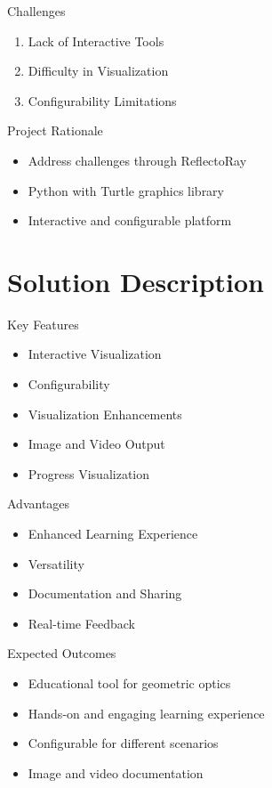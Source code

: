 \documentclass{beamer}
\begin{document}
\begin{frame}{Challenges}
  \begin{enumerate}
    \item Lack of Interactive Tools
    \item Difficulty in Visualization
    \item Configurability Limitations
  \end{enumerate}
\end{frame}

\begin{frame}{Project Rationale}
  \begin{itemize}
    \item Address challenges through ReflectoRay
    \item Python with Turtle graphics library
    \item Interactive and configurable platform
  \end{itemize}
\end{frame}

\section{Solution Description}
\begin{frame}{Key Features}
  \begin{itemize}
    \item Interactive Visualization
    \item Configurability
    \item Visualization Enhancements
    \item Image and Video Output
    \item Progress Visualization
  \end{itemize}
\end{frame}

\begin{frame}{Advantages}
  \begin{itemize}
    \item Enhanced Learning Experience
    \item Versatility
    \item Documentation and Sharing
    \item Real-time Feedback
  \end{itemize}
\end{frame}

\begin{frame}{Expected Outcomes}
  \begin{itemize}
    \item Educational tool for geometric optics
    \item Hands-on and engaging learning experience
    \item Configurable for different scenarios
    \item Image and video documentation
  \end{itemize}
\end{frame}
\end{document}

